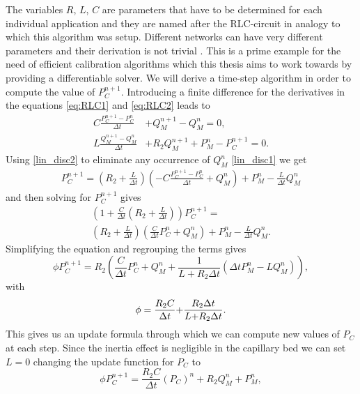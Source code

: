 \documentclass[a4paper, oneside]{discothesis}
\begin{document}
	The variables $R$, $L$, $C$ are parameters that have to be determined for each individual application and they are named after the RLC-circuit in analogy to which this algorithm was setup.
	Different networks can have very different parameters and their derivation is not trivial \cite{köppl2023dimension}.
	This is a prime example for the need of efficient calibration algorithms which this thesis aims to work towards by providing a differentiable solver.
	We will derive a time-step algorithm in order to compute the value of $P_C^{n+1}$.
	Introducing a finite difference for the derivatives in the equations \autoref{eq:RLC1} and \autoref{eq:RLC2} leads to
	\begin{align}
		C{\frac{P_C^{n+1}-P_C^{n}}{\Delta t}} &+ Q_M^{n+1}-Q_M^n = 0, \label{lin_disc1}\\ 
		L\frac{Q_M^{n+1}-Q_M^{n}}{\Delta t} &+ R_{2}Q_M^{n+1}+P_M^n-P_C^{n+1} = 0. \label{lin_disc2}
	\end{align}
	Using \ref{lin_disc2} to eliminate any occurrence of $Q_M^n$ \ref{lin_disc1} we get
	\begin{align}
		P_C^{n+1} = \left(R_2 + \frac{L}{\Delta t}\right) \left( - C \frac{P_C^{n+1} - P_C^{n}}{\Delta t} + Q_M^n\right)+ P_M^n - \frac{L}{\Delta t} Q_M^{n}
	\end{align}
	and then solving for $P_C^{n+1}$ gives
	\begin{multline}
		\left( 1+ \frac{C}{\Delta t}\left( R_2 + \frac{L}{\Delta t} \right) \right) P_C^{n+1} = \\
		\left( R_2 + \frac{L}{\Delta t} \right) \left( \frac{C}{\Delta t} P_C^n + Q_M^n \right) + P_M^n - \frac{L}{\Delta t} Q_M^n.
	\end{multline}
	Simplifying the equation and regrouping the terms gives
	\begin{equation}
		\phi P_{C}^{n+1}=R_2 \left( \frac{C}{\Delta t}P_C^{n} + Q_M^n+\frac{1}{L+R_{2}\Delta t}\left(\Delta t P_M^n-L Q_M^{n}\right) \right),
	\end{equation}
	with 
	\begin{equation}
		\phi=\frac{R_{2}C}{\Delta t}{\bf+}\frac{R_{2}\Delta t}{L{+}R_{2}\Delta t}. \label{RCL}
	\end{equation}
	This gives us an update formula through which we can compute new values of $P_C$ at each step.
	Since the inertia effect is negligible in the capillary bed we can set $L=0$ changing the update function for $P_C$ to 
	\begin{equation}
		\phi P_{C}^{n+1}=\frac{R_{2}C}{\Delta t}(P_{C})^{n}+R_{2} Q_M^n+P_M^n,
	\end{equation}
\end{document}
